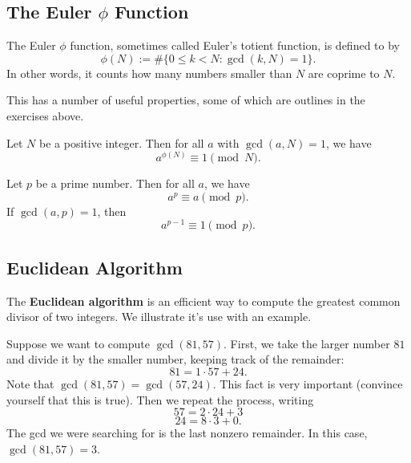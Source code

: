 \documentclass{article}
\begin{document}
    \subsection{The Euler \(\phi\) Function}

        \begin{definition}
            The Euler \(\phi\) function, sometimes called Euler's totient function, is defined to by
            \[\phi(N) := \#\{0\leq k<N : \gcd(k,N) = 1\}.\]
            In other words, it counts how many numbers smaller than \(N\) are coprime to \(N\).
        \end{definition}

        This has a number of useful properties, some of which are outlines in the exercises above.

        \begin{theorem}
            Let \(N\) be a positive integer.
            Then for all \(a\) with \(\gcd(a,N)=1\), we have
            \[a^{\phi(N)}\equiv 1\pmod{N}.\]
        \end{theorem}

        \begin{corollary}
            Let \(p\) be a prime number.
            Then for all \(a\), we have
            \[a^p\equiv a\pmod{p}.\]
            If \(\gcd(a,p)=1\), then 
            \[a^{p-1}\equiv 1\pmod{p}.\]
        \end{corollary}

    \subsection{Euclidean Algorithm}

        The \textbf{Euclidean algorithm} is an efficient way to compute the greatest common divisor of two integers.
        We illustrate it's use with an example.
        
        Suppose we want to compute \(\gcd(81,57)\).
        First, we take the larger number \(81\) and divide it by the smaller number, keeping track of the remainder:
        \[81 = 1\cdot 57 + 24.\]
        Note that \(\gcd(81,57)=\gcd(57,24)\).
        This fact is very important (convince yourself that this is true).
        Then we repeat the process, writing
        \[57 = 2\cdot 24 + 3\]
        \[24 = 8\cdot 3 + 0.\]
        The gcd we were searching for is the last nonzero remainder.
        In this case, \(\gcd(81,57) = 3\).
\end{document}
